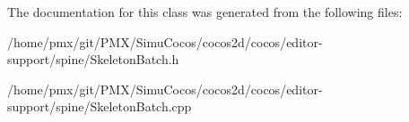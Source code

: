 The documentation for this class was generated from the following files\+:\begin{DoxyCompactItemize}
\item 
/home/pmx/git/\+P\+M\+X/\+Simu\+Cocos/cocos2d/cocos/editor-\/support/spine/Skeleton\+Batch.\+h\item 
/home/pmx/git/\+P\+M\+X/\+Simu\+Cocos/cocos2d/cocos/editor-\/support/spine/Skeleton\+Batch.\+cpp\end{DoxyCompactItemize}
